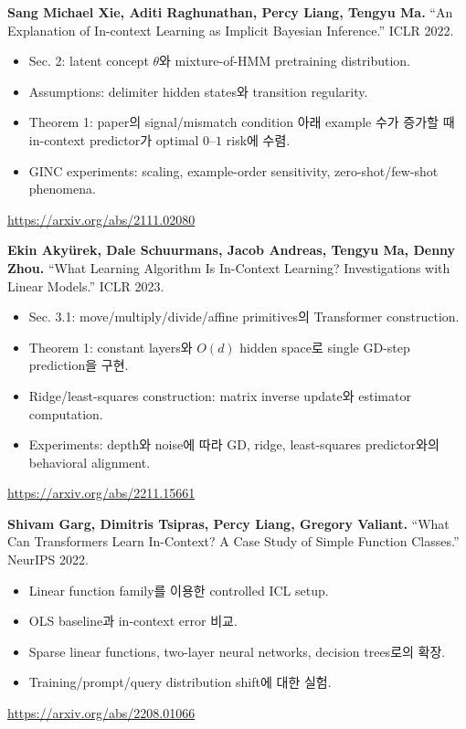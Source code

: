 \documentclass[11pt,a4paper,oneside,openany]{memoir}
\theoremstyle{definition}
\begin{document}
\vspace{0.8em}
\textbf{Sang Michael Xie, Aditi Raghunathan, Percy Liang, Tengyu Ma.}
``An Explanation of In-context Learning as Implicit Bayesian Inference.'' ICLR 2022.

\begin{itemize}
\item Sec. 2: latent concept $\theta$와 mixture-of-HMM pretraining distribution.
\item Assumptions: delimiter hidden states와 transition regularity.
\item Theorem 1: paper의 signal/mismatch condition 아래 example 수가 증가할 때 in-context predictor가 optimal $0$--$1$ risk에 수렴.
\item GINC experiments: scaling, example-order sensitivity, zero-shot/few-shot phenomena.
\end{itemize}
\url{https://arxiv.org/abs/2111.02080}

\vspace{0.8em}
\textbf{Ekin Akyürek, Dale Schuurmans, Jacob Andreas, Tengyu Ma, Denny Zhou.}
``What Learning Algorithm Is In-Context Learning? Investigations with Linear Models.'' ICLR 2023.

\begin{itemize}
\item Sec. 3.1: move/multiply/divide/affine primitives의 Transformer construction.
\item Theorem 1: constant layers와 $O(d)$ hidden space로 single GD-step prediction을 구현.
\item Ridge/least-squares construction: matrix inverse update와 estimator computation.
\item Experiments: depth와 noise에 따라 GD, ridge, least-squares predictor와의 behavioral alignment.
\end{itemize}
\url{https://arxiv.org/abs/2211.15661}

\vspace{0.8em}
\textbf{Shivam Garg, Dimitris Tsipras, Percy Liang, Gregory Valiant.}
``What Can Transformers Learn In-Context? A Case Study of Simple Function Classes.'' NeurIPS 2022.

\begin{itemize}
\item Linear function family를 이용한 controlled ICL setup.
\item OLS baseline과 in-context error 비교.
\item Sparse linear functions, two-layer neural networks, decision trees로의 확장.
\item Training/prompt/query distribution shift에 대한 실험.
\end{itemize}
\url{https://arxiv.org/abs/2208.01066}
\end{document}
